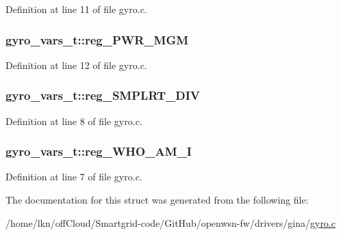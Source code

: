 Definition at line 11 of file gyro.\+c.

\subsubsection[{\texorpdfstring{reg\+\_\+\+P\+W\+R\+\_\+\+M\+GM}{reg_PWR_MGM}}]{ gyro\+\_\+vars\+\_\+t\+::reg\+\_\+\+P\+W\+R\+\_\+\+M\+GM}\hypertarget{structgyro__vars__t_a37906fc6d215031fa21a59d2d02fa88f}{}\label{structgyro__vars__t_a37906fc6d215031fa21a59d2d02fa88f}


Definition at line 12 of file gyro.\+c.

\subsubsection[{\texorpdfstring{reg\+\_\+\+S\+M\+P\+L\+R\+T\+\_\+\+D\+IV}{reg_SMPLRT_DIV}}]{ gyro\+\_\+vars\+\_\+t\+::reg\+\_\+\+S\+M\+P\+L\+R\+T\+\_\+\+D\+IV}\hypertarget{structgyro__vars__t_a551fbdf7797290c3afd9097bd5d0a54b}{}\label{structgyro__vars__t_a551fbdf7797290c3afd9097bd5d0a54b}


Definition at line 8 of file gyro.\+c.

\subsubsection[{\texorpdfstring{reg\+\_\+\+W\+H\+O\+\_\+\+A\+M\+\_\+I}{reg_WHO_AM_I}}]{ gyro\+\_\+vars\+\_\+t\+::reg\+\_\+\+W\+H\+O\+\_\+\+A\+M\+\_\+I}\hypertarget{structgyro__vars__t_a5406fe4dcbca24cb8a7630da974de65d}{}\label{structgyro__vars__t_a5406fe4dcbca24cb8a7630da974de65d}


Definition at line 7 of file gyro.\+c.



The documentation for this struct was generated from the following file\+:\begin{DoxyCompactItemize}
\item 
/home/lkn/off\+Cloud/\+Smartgrid-\/code/\+Git\+Hub/openwsn-\/fw/drivers/gina/\hyperlink{gyro_8c}{gyro.\+c}\end{DoxyCompactItemize}
